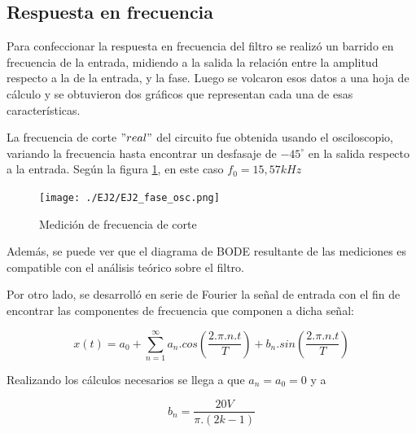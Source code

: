 \subsection{Respuesta en frecuencia}

\quad \quad Para confeccionar la respuesta en frecuencia del filtro se realiz\'o un barrido en frecuencia de la entrada, midiendo a la salida la relaci\'on entre la amplitud respecto a la de la entrada, y la fase. Luego se volcaron esos datos a una hoja de c\'alculo y se obtuvieron dos gr\'aficos que representan cada una de esas caracter\'isticas.




\quad \quad La frecuencia de corte $"real"$ del circuito fue obtenida usando el osciloscopio, variando la frecuencia hasta encontrar un desfasaje de $-45^\circ$ en la salida respecto a la entrada. Seg\'un la figura \ref{fig:phase_2}, en este caso $f_{0}=15,57kHz$


\begin{figure}[H]
    \centering
    \texttt{[image: ./EJ2/EJ2\_fase\_osc.png]}
    \caption{Medici\'on de frecuencia de corte}
    \label{fig:phase_2} 
\end{figure}
\quad \quad Adem\'as, se puede ver que el diagrama de BODE resultante de las mediciones es compatible con el an\'alisis te\'orico sobre el filtro.

\quad \quad Por otro lado, se desarroll\'o en serie de Fourier la se\~nal de entrada con el fin de encontrar las componentes de frecuencia que componen a dicha se\~nal:

\begin{equation}
    x(t) = a_{0} + \sum_{n=1}^{\infty}a_{n}.cos(\frac{2.\pi.n.t}{T}) + b_{n}.sin(\frac{2.\pi.n.t}{T}) 
\end{equation}

Realizando los c\'alculos necesarios se llega a que $a_{n} = a_{0} = 0$ y a

\begin{equation}
    b_{n} = \frac{20V}{\pi.(2k-1)}  
\end{equation}

